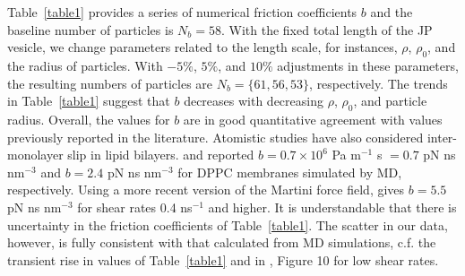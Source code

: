 \documentclass[lineno]{jfm}
\newcommand{\ReviewerOne}[1]{\textcolor{red}{#1}}
\begin{document}
Table~\ref{table1} provides a series of numerical friction coefficients $b$ and the baseline number of particles is $N_b = 58$. With the fixed total length of the JP vesicle, we change parameters related to the length scale, for instances, $\rho$, $\rho_0$, and the radius of particles.
With $-5\%$, $5\%$, and $10\%$ adjustments in these parameters, the resulting numbers of particles are $N_b=\{61,56,53\}$, respectively.
%
The trends in Table~\ref{table1}
  suggest that $b$ decreases with decreasing $\rho$, $\rho_0$, and particle radius.
Overall, the values for $b$ are 
in good quantitative agreement with values previously reported in the literature.
Atomistic studies have also considered inter-monolayer slip in lipid bilayers. 
\cite{WuoEd06} and \cite{denOtter2007} reported $b = 0.7 \times 10^6$ Pa m$^{-1}$ s  
$=0.7$ pN ns nm$^{-3}$  
and $b = 2.4$  pN ns nm$^{-3}$ for DPPC membranes simulated by MD, respectively. 
Using a more recent version of the Martini force field, \cite{Zgorski2019} 
gives $b = 5.5$ pN ns nm$^{-3}$ for shear rates 0.4 ns$^{-1}$ and higher.
It is understandable that there is uncertainty in the friction coefficients of
Table~\ref{table1}.  The scatter in our data, however, is fully consistent with that calculated
from MD simulations, c.f. the transient rise in values of Table~\ref{table1} and in \cite{Zgorski2019}, Figure 10
for low shear rates. 
\end{document}
